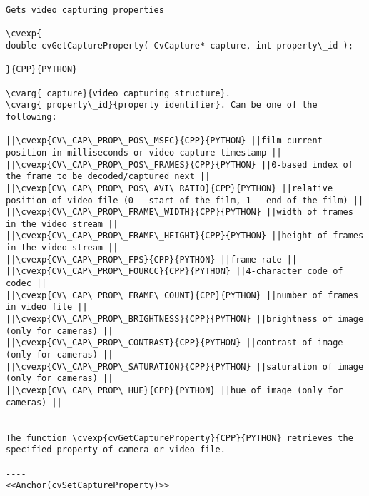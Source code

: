 \begin{verbatim}
Gets video capturing properties

\cvexp{
double cvGetCaptureProperty( CvCapture* capture, int property\_id );

}{CPP}{PYTHON}

\cvarg{ capture}{video capturing structure}.
\cvarg{ property\_id}{property identifier}. Can be one of the following:

||\cvexp{CV\_CAP\_PROP\_POS\_MSEC}{CPP}{PYTHON} ||film current position in milliseconds or video capture timestamp ||
||\cvexp{CV\_CAP\_PROP\_POS\_FRAMES}{CPP}{PYTHON} ||0-based index of the frame to be decoded/captured next ||
||\cvexp{CV\_CAP\_PROP\_POS\_AVI\_RATIO}{CPP}{PYTHON} ||relative position of video file (0 - start of the film, 1 - end of the film) ||
||\cvexp{CV\_CAP\_PROP\_FRAME\_WIDTH}{CPP}{PYTHON} ||width of frames in the video stream ||
||\cvexp{CV\_CAP\_PROP\_FRAME\_HEIGHT}{CPP}{PYTHON} ||height of frames in the video stream ||
||\cvexp{CV\_CAP\_PROP\_FPS}{CPP}{PYTHON} ||frame rate ||
||\cvexp{CV\_CAP\_PROP\_FOURCC}{CPP}{PYTHON} ||4-character code of codec ||
||\cvexp{CV\_CAP\_PROP\_FRAME\_COUNT}{CPP}{PYTHON} ||number of frames in video file ||
||\cvexp{CV\_CAP\_PROP\_BRIGHTNESS}{CPP}{PYTHON} ||brightness of image (only for cameras) ||
||\cvexp{CV\_CAP\_PROP\_CONTRAST}{CPP}{PYTHON} ||contrast of image (only for cameras) ||
||\cvexp{CV\_CAP\_PROP\_SATURATION}{CPP}{PYTHON} ||saturation of image (only for cameras) ||
||\cvexp{CV\_CAP\_PROP\_HUE}{CPP}{PYTHON} ||hue of image (only for cameras) ||


The function \cvexp{cvGetCaptureProperty}{CPP}{PYTHON} retrieves the specified property of camera or video file.

----
<<Anchor(cvSetCaptureProperty)>>
\end{verbatim}
